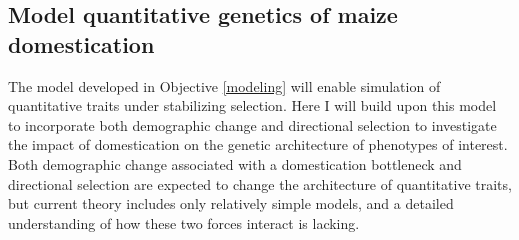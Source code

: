 

		
\subsection{Model quantitative genetics of maize domestication}\vspace{-1ex}
\label{domestication}
The model developed in Objective \ref{modeling} will enable simulation of quantitative traits under stabilizing selection. Here I will build upon this model to incorporate both demographic change and directional selection to investigate the impact of domestication on the genetic architecture of phenotypes of interest. Both demographic change associated with a domestication bottleneck and directional selection are expected to change the architecture of quantitative traits, but current theory includes only relatively simple models, and a detailed understanding of how these two forces interact is lacking. 

